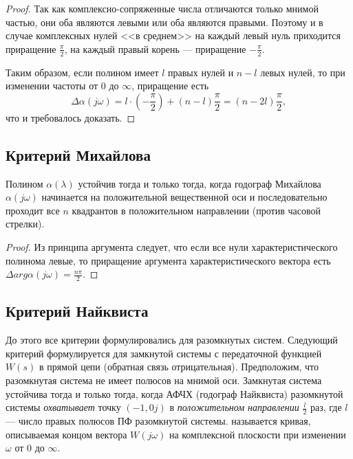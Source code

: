\documentclass[../../TAU.tex]{subfiles}
\begin{document}
\begin{proof}
        Так как комплексно-сопряженные числа отличаются только мнимой частью, они оба являются левыми или оба являются правыми.
        Поэтому и в случае комплексных нулей <<в среднем>> на каждый левый нуль приходится приращение $\frac{\pi}{2}$, на каждый правый корень --- приращение {$-\frac{\pi}{2}$}.\par
        Таким образом, если полином имеет $l$ правых нулей и $n-l$ левых нулей, то при изменении частоты от $0$ до $\infty$, приращение есть
        $$
            \Delta \alpha(j \omega) = l\cdot(-\frac{\pi}{2})+(n-l)\frac{\pi}{2} = (n-2 l)\frac{\pi}{2},
        $$
        что и требовалось доказать.
    \end{proof}

\subsection{Критерий Михайлова}

    Полином $\alpha(\lambda)$ устойчив тогда  и только тогда, когда годограф Михайлова $\alpha(j\omega)$ начинается на положительной вещественной оси и последовательно проходит все $n$ квадрантов в положительном направлении (против часовой стрелки).

    \begin{proof}
        Из принципа аргумента следует, что если все нули характеристического полинома левые, то приращение аргумента характеристического вектора есть $\Delta arg \alpha(j \omega)=\frac{n \pi}{2}$.
    \end{proof}

\subsection{Критерий Найквиста}

    До этого все критерии формулировались для разомкнутых систем. Следующий критерий формулируется для замкнутой системы с передаточной функцией $W(s)$  в прямой цепи (обратная связь отрицательная).
    \theor[Найквист] Предположим, что разомкнутая система не имеет полюсов на мнимой оси.
    Замкнутая система устойчива тогда и только тогда, когда АФЧХ (годограф Найквиста) разомкнутой системы {\it охватывает} точку $(-1, 0j)$ в {\it положительном направлении} $\frac{l}{2}$ раз, где $l$ --- число правых полюсов ПФ разомкнутой системы.
     называется кривая, описываемая концом вектора $W(j\omega)$ на комплексной плоскости при изменении $\omega$ от $0$ до $\infty$.
\end{document}
